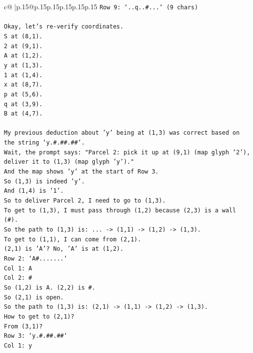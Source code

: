 \documentclass{article}
\begin{document}
{\begin{supertabular}{c@{$\;$}|p{.15\linewidth}@{}p{.15\linewidth}p{.15\linewidth}p{.15\linewidth}p{.15\linewidth}p{.15\linewidth}}
{{{\texttt{Row 9: `..q..\#...` (9 chars)} \\
\\ 
\texttt{Okay, let's re{-}verify coordinates.} \\
\texttt{S at (8,1).} \\
\texttt{2 at (9,1).} \\
\texttt{A at (1,2).} \\
\texttt{y at (1,3).} \\
\texttt{1 at (1,4).} \\
\texttt{x at (8,7).} \\
\texttt{p at (5,6).} \\
\texttt{q at (3,9).} \\
\texttt{B at (4,7).} \\
\\ 
\texttt{My previous deduction about 'y' being at (1,3) was correct based on the string `y.\#.\#\#.\#\#`.} \\
\texttt{Wait, the prompt says: "Parcel 2: pick it up at (9,1) (map glyph '2'), deliver it to (1,3) (map glyph 'y')."} \\
\texttt{And the map shows 'y' at the start of Row 3.} \\
\texttt{So (1,3) is indeed 'y'.} \\
\texttt{And (1,4) is '1'.} \\
\texttt{So to deliver Parcel 2, I need to go to (1,3).} \\
\texttt{To get to (1,3), I must pass through (1,2) because (2,3) is a wall (\#).} \\
\texttt{So the path to (1,3) is: ... {-}> (1,1) {-}> (1,2) {-}> (1,3).} \\
\texttt{To get to (1,1), I can come from (2,1).} \\
\texttt{(2,1) is 'A'? No, 'A' is at (1,2).} \\
\texttt{Row 2: `A\#.......`} \\
\texttt{Col 1: A} \\
\texttt{Col 2: \#} \\
\texttt{So (1,2) is A. (2,2) is \#.} \\
\texttt{So (2,1) is open.} \\
\texttt{So the path to (1,3) is: (2,1) {-}> (1,1) {-}> (1,2) {-}> (1,3).} \\
\texttt{How to get to (2,1)?} \\
\texttt{From (3,1)?} \\
\texttt{Row 3: `y.\#.\#\#.\#\#`} \\
\texttt{Col 1: y} \\
}}}
\end{supertabular}}
\end{document}
